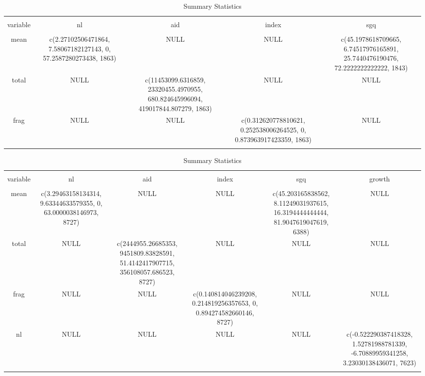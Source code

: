 
\begin{table}[!htbp] \centering 
  \caption{Summary Statistics} 
  \label{} 
\begin{tabular}{@{\extracolsep{5pt}} ccccc} 
\\[-1.8ex]\hline 
\hline \\[-1.8ex] 
variable & nl & aid & index & sgq \\ 
\hline \\[-1.8ex] 
mean & c(2.27102506471864, 7.58067182127143, 0, 57.2587280273438, 1863) & NULL & NULL & c(45.1978618709665, 6.74517976165891, 25.7440476190476, 72.2222222222222, 1843) \\ 
total & NULL & c(11453099.6316859, 23320455.4970955, 680.824645996094, 419017844.807279, 1863) & NULL & NULL \\ 
frag & NULL & NULL & c(0.312620778810621, 0.252538006264525, 0, 0.873963917423359, 1863) & NULL \\ 
\hline \\[-1.8ex] 
\end{tabular} 
\end{table} 

\begin{table}[!htbp] \centering 
  \caption{Summary Statistics} 
  \label{} 
\begin{tabular}{@{\extracolsep{5pt}} cccccc} 
\\[-1.8ex]\hline 
\hline \\[-1.8ex] 
variable & nl & aid & index & sgq & growth \\ 
\hline \\[-1.8ex] 
mean & c(3.29463158134314, 9.63344633579355, 0, 63.0000038146973, 8727) & NULL & NULL & c(45.203165838562, 8.11249031937615, 16.3194444444444, 81.9047619047619, 6388) & NULL \\ 
total & NULL & c(2444955.26685353, 9451809.83828591, 51.4142417907715, 356108057.686523, 8727) & NULL & NULL & NULL \\ 
frag & NULL & NULL & c(0.140814046239208, 0.214819256357653, 0, 0.894274582660146, 8727) & NULL & NULL \\ 
nl & NULL & NULL & NULL & NULL & c(-0.522290387418328, 1.52781988781339, -6.70889959341258, 3.23030138436071, 7623) \\ 
\hline \\[-1.8ex] 
\end{tabular} 
\end{table} 
